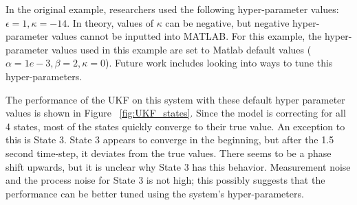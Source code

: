 \noindent In the original example, researchers used the following hyper-parameter values: $\epsilon = 1, \kappa = -14$. In theory, values of $\kappa$ can be negative, but negative hyper-parameter values cannot be inputted into MATLAB. For this example, the hyper-parameter values used in this example are set to Matlab default values ($\alpha = 1e-3, \beta = 2, \kappa = 0$).  Future work includes looking into ways to tune this hyper-parameters. \\

\clearpage 





\noindent The performance of the UKF on this system with these default hyper parameter values is shown in Figure ~\ref{fig:UKF_states}. Since the model is correcting for all 4 states, most of the states quickly converge to their true value. An exception to this is State 3. State 3 appears to converge in the beginning, but after the 1.5 second time-step, it deviates from the true values. There seems to be a phase shift upwards, but it is unclear why State 3 has this behavior. Measurement noise and the process noise for State 3 is not high; this possibly suggests that the performance can be better tuned using the system's hyper-parameters.





